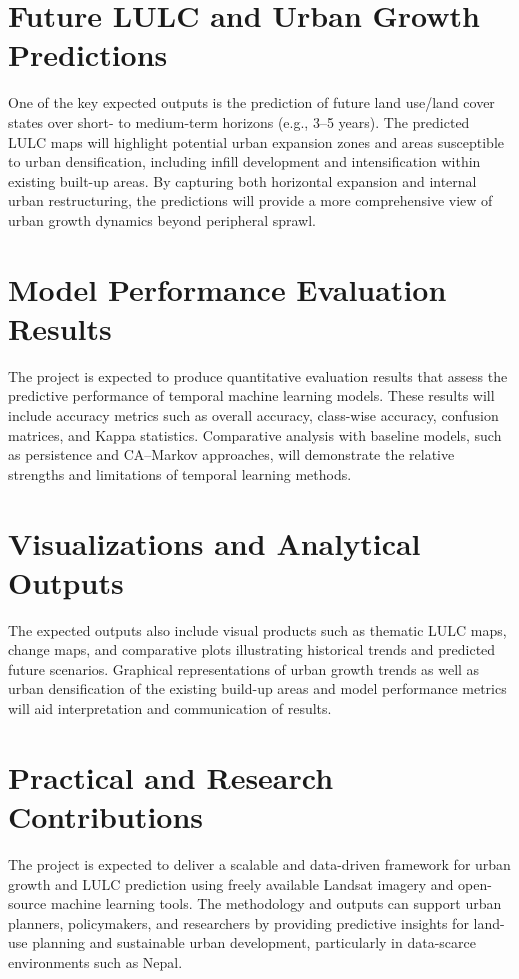 \documentclass[main]{subfiles}
\begin{document}
\section{Future LULC and Urban Growth Predictions}

One of the key expected outputs is the prediction of future land use/land cover states over short- to medium-term horizons (e.g., 3--5 years). The predicted LULC maps will highlight potential urban expansion zones and areas susceptible to urban densification, including infill development and intensification within existing built-up areas. By capturing both horizontal expansion and internal urban restructuring, the predictions will provide a more comprehensive view of urban growth dynamics beyond peripheral sprawl.

\section{Model Performance Evaluation Results}

The project is expected to produce quantitative evaluation results that assess the predictive performance of temporal machine learning models. These results will include accuracy metrics such as overall accuracy, class-wise accuracy, confusion matrices, and Kappa statistics. Comparative analysis with baseline models, such as persistence and CA--Markov approaches, will demonstrate the relative strengths and limitations of temporal learning methods.

\section{Visualizations and Analytical Outputs}

The expected outputs also include visual products such as thematic LULC maps, change maps, and comparative plots illustrating historical trends and predicted future scenarios. Graphical representations of urban growth trends as well as urban densification of the existing build-up areas and model performance metrics will aid interpretation and communication of results.

\section{Practical and Research Contributions}

The project is expected to deliver a scalable and data-driven framework for urban growth and LULC prediction using freely available Landsat imagery and open-source machine learning tools. The methodology and outputs can support urban planners, policymakers, and researchers by providing predictive insights for land-use planning and sustainable urban development, particularly in data-scarce environments such as Nepal.
\end{document}
